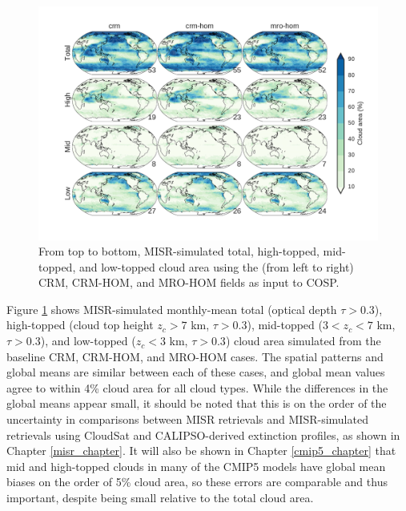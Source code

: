 \begin{figure}
\centering
\includegraphics[width=\columnwidth]{graphics/subgrid1_cldmisr_maps.pdf}
\caption{From top to bottom, MISR-simulated total, high-topped, mid-topped, and low-topped cloud area using the (from left to right) CRM, CRM-HOM, and MRO-HOM fields as input to COSP.}
\label{subgrid1_cldmisr_maps}
\end{figure}

Figure \ref{subgrid1_cldmisr_maps} shows MISR-simulated monthly-mean total (optical depth $\tau > 0.3$), high-topped (cloud top height $z_c > 7$ km, $\tau > 0.3$), mid-topped ($3 < z_c < 7$ km, $\tau > 0.3$), and low-topped ($z_c < 3$ km, $\tau > 0.3$) cloud area simulated from the baseline CRM, CRM-HOM, and MRO-HOM cases. The spatial patterns and global means are similar between each of these cases, and global mean values agree to within 4\% cloud area for all cloud types. While the differences in the global means appear small, it should be noted that this is on the order of the uncertainty in comparisons between MISR retrievals and MISR-simulated retrievals using CloudSat and CALIPSO-derived extinction profiles, as shown in Chapter \ref{misr_chapter}. It will also be shown in Chapter \ref{cmip5_chapter} that mid and high-topped clouds in many of the CMIP5 models have global mean biases on the order of 5\% cloud area, so these errors are comparable and thus important, despite being small relative to the total cloud area.

